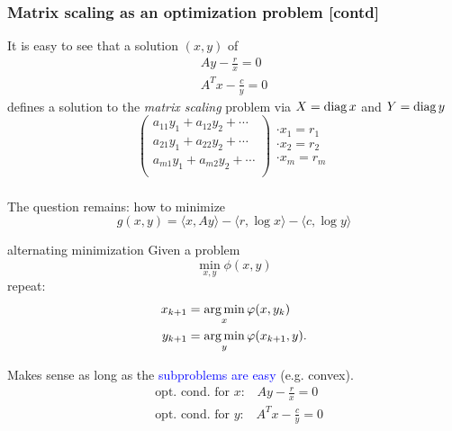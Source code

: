 \documentclass{beamer}
\begin{document}
\begin{frame}
  \frametitle{Matrix scaling as an optimization problem [contd]}
  It is easy to see that a solution $(x,y)$ of
  \begin{equation}
    \begin{aligned}
      Ay - \frac{r}{x} = 0 \\
      A^T x - \frac{c}{y} = 0
    \end{aligned}
  \end{equation}
  defines a solution to the \emph{matrix scaling} problem via $X=\operatorname*{diag} x$ and $Y=\operatorname*{diag} y$
  \begin{equation}
    \left(\begin{array}{c}
            a_{1 1} y_1 + a_{1 2} y_2 + \cdots \\
            a_{2 1} y_1 + a_{2 2} y_2 + \cdots \\
            a_{m 1} y_1 + a_{m 2} y_2 + \cdots \\
          \end{array}\right)
        \begin{array}{c}
          \cdot x_1 = r_1\\
          \cdot x_2 = r_2\\
          \cdot x_m = r_m
        \end{array}
      \end{equation}
\end{frame}

\begin{frame}
  \frametitle{}
  The question remains: how to minimize
  \begin{equation}
    g(x,y) = \langle x, A y \rangle - \langle r, \log x \rangle - \langle c, \log y \rangle
  \end{equation}
  \vspace{-0.5cm}
  \begin{block}{alternating minimization}
    Given a problem
    \begin{equation}
      \min_{x,y} \phi(x,y)
    \end{equation}
    repeat:
    \begin{align}
      x_{k+1} &= \operatorname*{arg\,min}_x \varphi(x,y_k) \\
      y_{k+1} &= \operatorname*{arg\,min}_y \varphi(x_{k+1}, y).
    \end{align}
  \end{block}
    Makes sense as long as the \textcolor{blue}{subproblems are easy} (e.g. convex).
  \begin{align}
    &\text{opt. cond.\ for $x$:} \quad Ay - \frac{r}{x} = 0 \\
    &\text{opt. cond.\ for $y$:} \quad A^T x - \frac{c}{y} = 0
  \end{align}
\end{frame}
\end{document}
